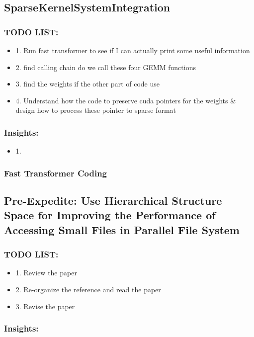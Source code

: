 \documentclass[UTF8]{article}
\begin{document}
\subsection{SparseKernelSystemIntegration}
\subsubsection{TODO LIST:}
\begin{itemize}
    \item 1. Run fast transformer to see if I can actually print some useful information
    \item 2. find calling chain do we call these four GEMM functions 
    \item 3. find the weights if the other part of code use
    \item 4. Understand how the code to preserve cuda pointers for the weights \& design how to process these pointer to sparse format
\end{itemize}
\subsubsection{Insights:}
\begin{itemize}
    \item 1.
\end{itemize}
\subsubsection{Fast Transformer Coding}

\subsection{Pre-Expedite: Use Hierarchical Structure Space for Improving the Performance of Accessing Small Files in Parallel File System}
\subsubsection{TODO LIST:}
\begin{itemize}
    \item 1. Review the paper
    \item 2. Re-organize the reference and read the paper
    \item 3. Revise the paper
\end{itemize}
\subsubsection{Insights:}
\end{document}
